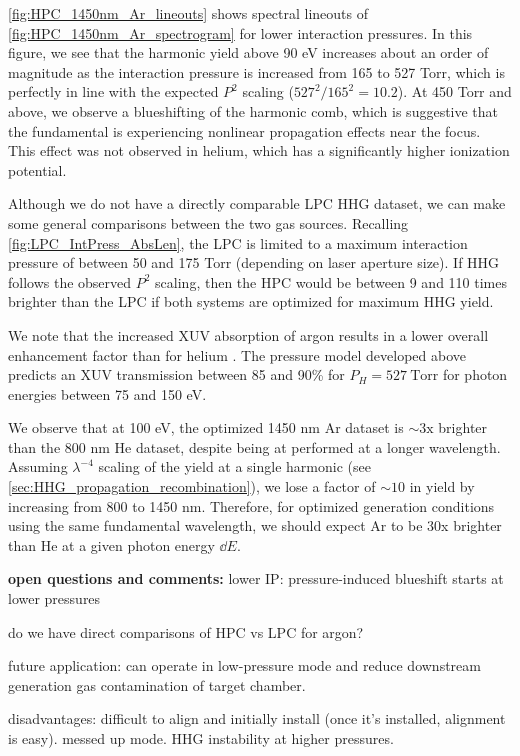 \cref{fig:HPC_1450nm_Ar_lineouts} shows spectral lineouts of \cref{fig:HPC_1450nm_Ar_spectrogram} for lower interaction pressures. In this figure, we see that the harmonic yield above 90 eV increases about an order of magnitude as the interaction pressure is increased from 165 to 527 Torr, which is perfectly in line with the expected $P^2$ scaling ($527^2/165^2 = 10.2$). At 450 Torr and above, we observe a blueshifting of the harmonic comb, which is suggestive that the fundamental is experiencing nonlinear propagation effects near the focus. This effect was not observed in helium, which has a significantly higher ionization potential.

Although we do not have a directly comparable LPC HHG dataset, we can make some general comparisons between the two gas sources. Recalling \cref{fig:LPC_IntPress_AbsLen}, the LPC is limited to a maximum interaction pressure of between 50 and 175 Torr (depending on laser aperture size). If HHG follows the observed $P^2$ scaling, then the HPC would be between 9 and 110 times brighter than the LPC if both systems are optimized for maximum HHG yield.

We note that the increased XUV absorption of argon results in a lower overall enhancement factor than for helium \cite{popmintchevPhaseMatchingHigh2009}. The pressure model developed above predicts an XUV transmission between 85 and 90\% for $P_H = 527 \ \textrm{Torr}$ for photon energies between 75 and 150 eV.

We observe that at 100 eV, the optimized 1450 nm Ar dataset is $\sim 3\textrm{x}$ brighter than the 800 nm He dataset, despite being at performed at a longer wavelength. Assuming $\lambda^{-4}$ scaling of the yield at a single harmonic (see \cref{sec:HHG_propagation_recombination}), we lose a factor of $\sim 10$ in yield by increasing from 800 to 1450 nm. Therefore, for optimized generation conditions using the same fundamental wavelength, we should expect Ar to be 30x brighter than He at a given photon energy $\dd E$.



\textbf{open questions and comments:}
lower IP: pressure-induced blueshift starts at lower pressures

do we have direct comparisons of HPC vs LPC for argon?




future application: can operate in low-pressure mode and reduce downstream generation gas contamination of target chamber.

disadvantages: difficult to align and initially install (once it's installed, alignment is easy). messed up mode. HHG instability at higher pressures.



